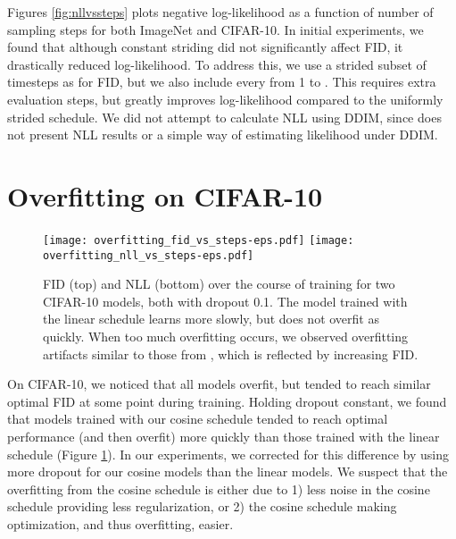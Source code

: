 \documentclass{article}
\begin{document}
Figures \ref{fig:nllvssteps} plots negative log-likelihood as a function of number of sampling steps for both ImageNet  and CIFAR-10. In initial experiments, we found that although constant striding did not significantly affect FID, it drastically reduced log-likelihood. To address this, we use a strided subset of timesteps as for FID, but we also include every  from 1 to . This requires  extra evaluation steps, but greatly improves log-likelihood compared to the uniformly strided schedule. We did not attempt to calculate NLL using DDIM, since \citet{ddim} does not present NLL results or a simple way of estimating likelihood under DDIM.

\clearpage

\section{Overfitting on CIFAR-10}
\label{app:overfitting}

\begin{figure}[ht]
    \centering
    \texttt{[image: overfitting\_fid\_vs\_steps-eps.pdf]}
    \texttt{[image: overfitting\_nll\_vs\_steps-eps.pdf]}
    \caption{\label{fig:overfitting} FID (top) and NLL (bottom) over the course of training for two CIFAR-10 models, both with dropout 0.1. The model trained with the linear schedule learns more slowly, but does not overfit as quickly. When too much overfitting occurs, we observed overfitting artifacts similar to those from \citet{pixelcnn++}, which is reflected by increasing FID.}
\end{figure}

On CIFAR-10, we noticed that all models overfit, but tended to reach similar optimal FID at some point during training. Holding dropout constant, we found that models trained with our cosine schedule tended to reach optimal performance (and then overfit) more quickly than those trained with the linear schedule (Figure \ref{fig:overfitting}). In our experiments, we corrected for this difference by using more dropout for our cosine models than the linear models. We suspect that the overfitting from the cosine schedule is either due to 1) less noise in the cosine schedule providing less regularization, or 2) the cosine schedule making optimization, and thus overfitting, easier.

\newpage
\end{document}
